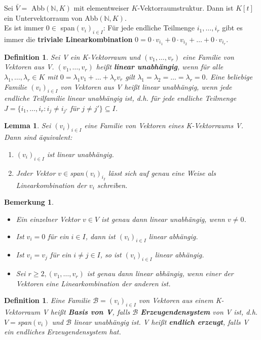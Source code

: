 \documentclass[12pt,a4paper]{article}
\theoremstyle{plain}
\newtheorem{Lemma}[Theorem]{Lemma}
\newtheorem{Definition}[Theorem]{Definition}
\newtheorem{Bemerkung}[Theorem]{Bemerkung}
\newcommand{\herv}[1]{{\emph{\textbf{#1}}}}
\newcommand{\N}{\mathbb{N}}
\numberwithin{equation}{section}
\begin{document}
Sei $\bar{V}=$ Abb$(\N,K)$ mit elementweiser $K$-Vektorraumstruktur. Dann ist $K[t]$ ein Untervektorraum von Abb$(\N,K)$.\\
Es ist immer $0\in$ span$(v_i)_{i\in I}$: Für jede endliche Teilmenge $i_1,\ldots,i_r$ gibt es immer die \textbf{triviale Linearkombination} $0=0\cdot v_{i_1}+0\cdot v_{i_2}+\ldots+0\cdot v_{i_r}$.
\begin{Definition}
Sei V ein K-Vektorraum und $(v_1,\ldots,v_r)$ eine Familie von Vektoren aus V. $(v_1,\ldots,v_r)$ heißt \herv{linear unabhängig}, wenn für alle $\lambda_1 ,\ldots , \lambda_r\in K$ mit $0=\lambda_1 v_1+\ldots+\lambda_r v_r$ gilt $\lambda_1=\lambda_2=\ldots=\lambda_r=0$. Eine beliebige Familie $(v_i)_{i\in I}$ von Vektoren aus V heißt linear unabhängig, wenn jede endliche Teilfamilie linear unabhängig ist, d.h. für jede endliche Teilmenge $J=\{i_1,\ldots,i_r : i_j\neq i_{j'}$ für $j\neq j'\}\subseteq I$.
\end{Definition}
\begin{Lemma}
Sei $(v_i)_{i\in I}$ eine Familie von Vektoren eines K-Vektorraums V. Dann sind äquivalent:
\begin{enumerate}
\renewcommand{\labelenumi}{\emph{(\roman{enumi})}}
\item $(v_i)_{i\in I}$ ist linear unabhängig.
\item Jeder Vektor $v\in$\emph{span}$(v_i)_{i_I}$ lässt sich auf genau eine Weise als Linearkombination der $v_i$ schreiben.
\end{enumerate}
\end{Lemma}
\begin{Bemerkung}\mbox{ }
\begin{itemize}
\item Ein einzelner Vektor $v\in V$ ist genau dann linear unabhängig, wenn $v\neq 0$.
\item Ist $v_i=0$ für ein $i\in I$, dann ist $(v_i)_{i\in I}$ linear abhängig.
\item Ist $v_i=v_j$ für ein $i\neq j \in I$, so ist $(v_i)_{i\in I}$ linear abhängig.
\item Sei $r\geq 2, (v_1,\ldots,v_r)$ ist genau dann linear abhängig, wenn einer der Vektoren eine Linearkombination der anderen ist.
\end{itemize}
\end{Bemerkung}
\begin{Definition}
Eine Familie $\mathcal{B}=(v_i)_{i\in I}$ von Vektoren aus einem K-Vektorraum V heißt \herv{Basis von V}, falls $\mathcal{B}$ \herv{Erzeugendensystem} von V ist, d.h. $V=$\emph{span}$(v_i)$ und $\mathcal{B}$ linear unabhängig ist. V heißt \herv{endlich erzeugt}, falls V ein endliches Erzeugendensystem hat.
\end{Definition}
\end{document}
